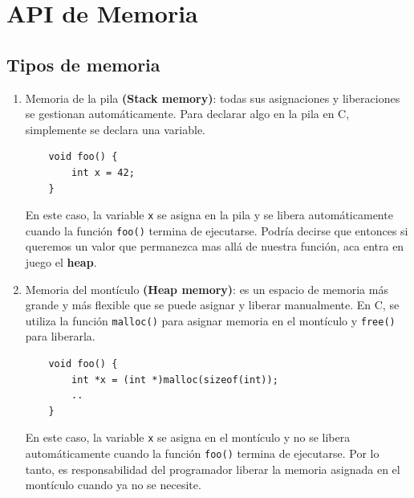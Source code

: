 \documentclass{article}
\begin{document}
\newpage
\section{API de Memoria}

\subsection{Tipos de memoria}
\begin{enumerate}
    \item Memoria de la pila \textbf{(Stack memory)}: todas sus asignaciones y liberaciones se gestionan automáticamente. Para declarar algo en la pila en C, simplemente se declara una variable. 
    \begin{verbatim}
    void foo() {
        int x = 42;
    }
    \end{verbatim}
    En este caso, la variable \texttt{x} se asigna en la pila y se libera automáticamente cuando la función \texttt{foo()} termina de ejecutarse. Podría decirse que entonces si queremos un valor que permanezca mas allá de nuestra función, aca entra en juego el \textbf{heap}.
    \item Memoria del montículo \textbf{(Heap memory)}: es un espacio de memoria más grande y más flexible que se puede asignar y liberar manualmente. En C, se utiliza la función \texttt{malloc()} para asignar memoria en el montículo y \texttt{free()} para liberarla.
    \begin{verbatim}
    void foo() {
        int *x = (int *)malloc(sizeof(int));
        ..
    }
    \end{verbatim}
    En este caso, la variable \texttt{x} se asigna en el montículo y no se libera automáticamente cuando la función \texttt{foo()} termina de ejecutarse. Por lo tanto, es responsabilidad del programador liberar la memoria asignada en el montículo cuando ya no se necesite.
\end{enumerate}
\end{document}
